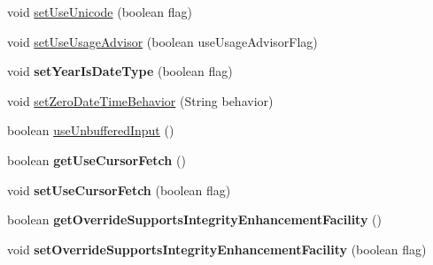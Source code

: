 \begin{DoxyCompactItemize}
\item 
void \mbox{\hyperlink{interfacecom_1_1mysql_1_1jdbc_1_1_connection_properties_a2b78e87d6cfd73e15066b8bdbc0cecb0}{set\+Use\+Unicode}} (boolean flag)
\item 
void \mbox{\hyperlink{interfacecom_1_1mysql_1_1jdbc_1_1_connection_properties_a8c6cb2052bdd1e63d3be6d2fcbd3908c}{set\+Use\+Usage\+Advisor}} (boolean use\+Usage\+Advisor\+Flag)
\item 
\mbox{\label{interfacecom_1_1mysql_1_1jdbc_1_1_connection_properties_a58ed45264061922c370a74580fc82021}} 
void {\bfseries set\+Year\+Is\+Date\+Type} (boolean flag)
\item 
void \mbox{\hyperlink{interfacecom_1_1mysql_1_1jdbc_1_1_connection_properties_a985e00fab1822f34c53443de78f7f597}{set\+Zero\+Date\+Time\+Behavior}} (String behavior)
\item 
boolean \mbox{\hyperlink{interfacecom_1_1mysql_1_1jdbc_1_1_connection_properties_ae9cefafa60524eaec697493db7349cc1}{use\+Unbuffered\+Input}} ()
\item 
\mbox{\label{interfacecom_1_1mysql_1_1jdbc_1_1_connection_properties_a88de1bc627966e32c339546f078c3c99}} 
boolean {\bfseries get\+Use\+Cursor\+Fetch} ()
\item 
\mbox{\label{interfacecom_1_1mysql_1_1jdbc_1_1_connection_properties_af1d48b45f0197c0e547cd0343bf69b16}} 
void {\bfseries set\+Use\+Cursor\+Fetch} (boolean flag)
\item 
\mbox{\label{interfacecom_1_1mysql_1_1jdbc_1_1_connection_properties_ac43c0b67bedb3f66c650f6eb5cdcbe6d}} 
boolean {\bfseries get\+Override\+Supports\+Integrity\+Enhancement\+Facility} ()
\item 
\mbox{\label{interfacecom_1_1mysql_1_1jdbc_1_1_connection_properties_aecc4d23142a9a612aadaea1fbeaf3831}} 
void {\bfseries set\+Override\+Supports\+Integrity\+Enhancement\+Facility} (boolean flag)
\item 
\mbox{\label{interfacecom_1_1mysql_1_1jdbc_1_1_connection_properties_a92acf11ec2081ec9907a2a3348816b28}} 

\end{DoxyCompactItemize}
